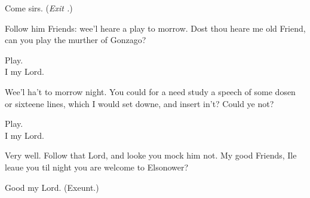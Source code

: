 \documentclass[a5paper,DIV=calc,11pt]{scrbook}
\begin{document}
\begin{drama*}
    \polspeaks Come sirs. \hfill(\textit{Exit \pol.})
    
    \hamspeaks Follow him Friends: wee'l heare a play to morrow. Dost thou heare me old Friend, can you play the murther of Gonzago?
    
    Play.\\
    I my Lord.
    
    \hamspeaks Wee'l ha't to morrow night. You could for a need study a speech of some dosen or sixteene lines, which I would set downe, and insert in't? Could ye not?
    
    Play.\\
    I my Lord.
    
    \hamspeaks Very well. Follow that Lord, and looke you mock him not. My good Friends, Ile leaue you til night you are welcome to Elsonower?
    
    \rosinspeaks Good my Lord. \hfill({Exeunt.})
    
    

\end{drama*}
\end{document}
